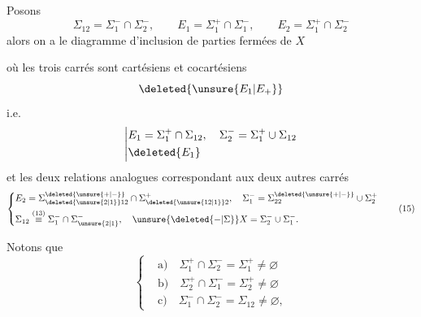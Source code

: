 \begingroup
\makeatletter\tagsleft@true\makeatother

Posons
\[
\Sigma_{12}=\Sigma_1^-\cap\Sigma_2^-,\qquad
E_1=\Sigma_1^+\cap\Sigma_1^-,\qquad
E_2=\Sigma_1^+\cap\Sigma_2^-\tag*{(13)}
\]
alors on a le diagramme d'inclusion de parties fermées de $X$

\usetikzlibrary{decorations.pathmorphing}


où les trois carrés sont cartésiens et cocartésiens
\[
\deleted{\unsure{E_1|E_+}}
\]
i.e.
\[
\left|\begin{aligned}
&E_1=\Sigma_1^+\cap\Sigma_{12},\quad \Sigma_2^-=\Sigma_1^+\cup\Sigma_{12}\\
&\deleted{E_1}
\end{aligned}\right.
\]
et les deux relations analogues correspondant aux deux autres carrés
\[
\left\{\begin{aligned}
&E_2=\Sigma_{\deleted{\unsure{2|1}}12}^{\deleted{\unsure{+|-}}}\cap\Sigma_{\deleted{\unsure{12|1}}2}^+,\quad
\Sigma_1^-=\Sigma_{22}^{\deleted{\unsure{+|-}}}\cup\Sigma_2^+\\
&\Sigma_{12}\overset{(13)}{\equiv}\Sigma_1^-\cap\Sigma_{\unsure{2|1}}^-,\quad
\unsure{\deleted{-|\Sigma}}X=\Sigma_2^-\cup\Sigma_1^-.
\end{aligned}\right.\tag*{(15)}
\]

Notons que
\[
\left\{\begin{aligned}
&\text{a)}\quad\Sigma_1^+\cap\Sigma_2^-=\Sigma_1^+\ne\varnothing\\
&\text{b)}\quad\Sigma_2^+\cap\Sigma_1^-=\Sigma_2^+\ne\varnothing\\
&\text{c)}\quad\Sigma_1^-\cap\Sigma_2^-=\Sigma_{12}\ne\varnothing,
\end{aligned}\right.\tag*{(16)}
\]

